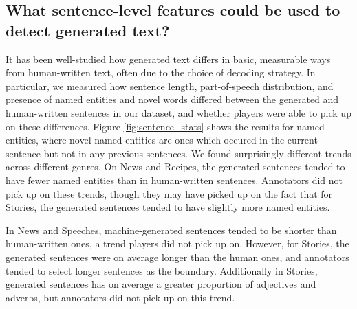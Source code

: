 \subsection{What sentence-level features could be used to detect generated text?}
It has been well-studied how generated text differs in basic, measurable ways from human-written text, often due to the choice of decoding strategy.
In particular, we measured how sentence length, part-of-speech distribution, and presence of named entities and novel words differed between the generated and human-written sentences in our dataset, and whether players were able to pick up on these differences.
Figure \ref{fig:sentence_stats} shows the results for named entities, where novel named entities are ones which occured in the current sentence but not in any previous sentences.
We found surprisingly different trends across different genres.
On News and Recipes, the generated sentences tended to have fewer named entities than in human-written sentences.
Annotators did not pick up on these trends, though they may have picked up on the fact that for Stories, the generated sentences tended to have slightly more named entities.

In News and Speeches, machine-generated sentences tended to be shorter than human-written ones, a trend players did not pick up on.
However, for Stories, the generated sentences were on average longer than the human ones, and annotators tended to select longer sentences as the boundary.
Additionally in Stories, generated sentences has on average a greater proportion of adjectives and adverbs, but annotators did not pick up on this trend.


